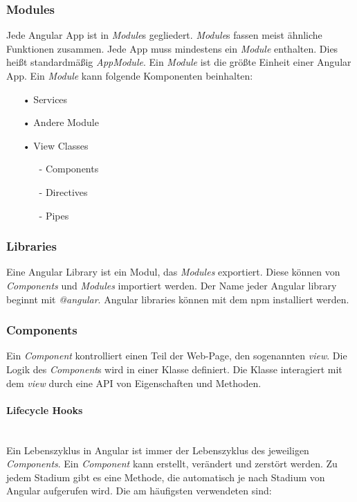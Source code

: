 
\subsubsection{Modules}
\label{sec:ang-modules}
Jede Angular App ist in \textit{Module}s gegliedert. \textit{Module}s fassen meist ähnliche Funktionen zusammen. Jede App muss mindestens ein \textit{Module} enthalten. Dies heißt standardmäßig \textit{AppModule}. Ein \textit{Module} ist die größte Einheit einer Angular App.  Ein \textit{Module} kann folgende Komponenten beinhalten:

\begin{itemize}
\item[•]Services
\item[•]Andere Module
\item[•]View Classes
\begin{itemize}
\item[-]Components
\item[-]Directives
\item[-]Pipes
\end{itemize}
\end{itemize}

\subsubsection{Libraries}
\label{sec:ang-libraries}
Eine Angular Library ist ein Modul, das \textit{Modules} exportiert. Diese können von \textit{Components} und \textit{Modules} importiert werden. Der Name jeder Angular library beginnt mit \textit{@angular}. Angular libraries können mit dem \ac{npm} installiert werden.

\subsubsection{Components}
\label{sec:ang-components}
Ein \textit{Component} kontrolliert einen Teil der Web-Page, den sogenannten \textit{view}. Die Logik des \textit{Component}s wird in einer Klasse definiert. Die Klasse interagiert mit dem \textit{view} durch eine \ac{API} von Eigenschaften und Methoden.

\paragraph*{Lifecycle Hooks}\mbox{}\\
Ein Lebenszyklus in Angular ist immer der Lebenszyklus des jeweiligen \textit{Components}. Ein \textit{Component} kann erstellt, verändert und zerstört werden. Zu jedem Stadium gibt es eine Methode, die automatisch je nach Stadium von Angular aufgerufen wird. Die am häufigsten verwendeten sind:

